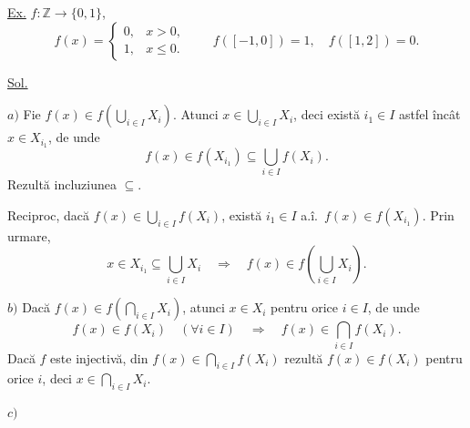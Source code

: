 \noindent\underline{Ex.} $f:\mathbb Z\longrightarrow\{0,1\}$,
\[
 f(x)=\begin{cases}
  0, & x>0,\\
  1, & x\leq 0.
 \end{cases}
 \qquad
 f([-1,0])=1,\quad f([1,2])=0.
\]

\medskip
\noindent\underline{Sol.}

\noindent $a)$ Fie
$ f(x)\in f\left(\bigcup_{i\in I}X_i\right)$.
Atunci $x\in\bigcup_{i\in I}X_i$, deci există $i_1\in I$
astfel încât $x\in X_{i_1}$, de unde
\[
 f(x)\in f(X_{i_1})\subseteq\bigcup_{i\in I}f(X_i).
\]
\noindent Rezultă incluziunea $\subseteq$.

\smallskip
\noindent Reciproc, dacă
$f(x)\in\bigcup_{i\in I}f(X_i)$, există $i_1\in I$
a.î.\ $f(x)\in f(X_{i_1})$. Prin urmare,
\[
 x\in X_{i_1}\subseteq\bigcup_{i\in I}X_i
 \quad\Longrightarrow\quad
 f(x)\in f\left(\bigcup_{i\in I}X_i\right).
\]

\medskip
\noindent $b)$ Dacă
$f(x)\in f\left(\bigcap_{i\in I}X_i\right)$, atunci
$x\in X_i$ pentru orice $i\in I$, de unde
\[
 f(x)\in f(X_i)\quad(\forall i\in I)
 \quad\Longrightarrow\quad
 f(x)\in\bigcap_{i\in I}f(X_i).
\]
\noindent Dacă $f$ este injectivă, din
$f(x)\in\bigcap_{i\in I}f(X_i)$ rezultă
$f(x)\in f(X_i)$ pentru orice $i$, deci
$x\in\bigcap_{i\in I}X_i$.

\medskip
\noindent $c)$
